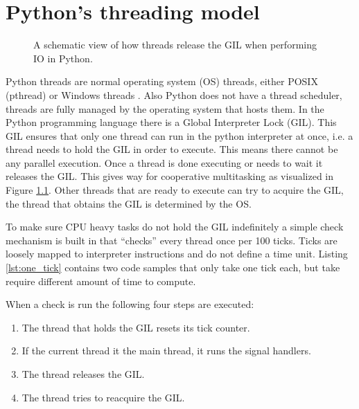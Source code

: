 \chapter{Python's threading model}
\label{cpt:pythons_thread_model}

\begin{figure}[t!]
	\caption{A schematic view of how threads release the GIL when performing IO in Python.}
	\label{fig:python_threads_release_gil}
\end{figure}

Python threads are normal operating system (OS) threads, either POSIX (pthread) or Windows threads \cite{beazley2010understanding, beazley2009inside}.
Also Python does not have a thread scheduler, threads are fully managed by the operating system that hosts them.
In the Python programming language there is a Global Interpreter Lock (GIL).
This GIL ensures that only one thread can run in the python interpreter at once, i.e. a thread needs to hold the GIL in order to execute.
This means there cannot be any parallel execution.
Once a thread is done executing or needs to wait it releases the GIL.
This gives way for cooperative multitasking as visualized in Figure \ref{fig:python_threads_release_gil}.
Other threads that are ready to execute can try to acquire the GIL, the thread that obtains the GIL is determined by the OS.

To make sure CPU heavy tasks do not hold the GIL indefinitely a simple check mechanism is built in that ``checks'' every thread once per 100 ticks.
Ticks are loosely mapped to interpreter instructions and do not define a time unit.
Listing \ref{lst:one_tick} contains two code samples that only take one tick each, but take require different amount of time to compute.



When a check is run the following four steps are executed:
\begin{enumerate}
	\item The thread that holds the GIL resets its tick counter.
	\item If the current thread it the main thread, it runs the signal handlers.
	\item The thread releases the GIL.
	\item The thread tries to reacquire the GIL.
\end{enumerate}

